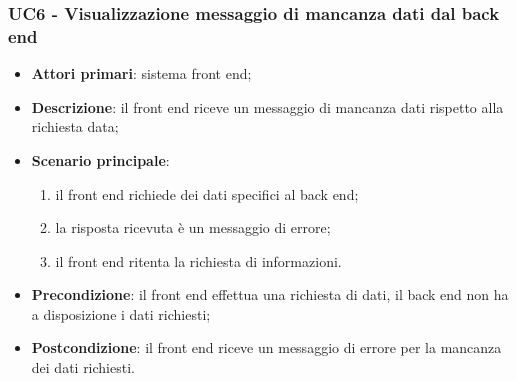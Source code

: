 \subsubsection{UC6 - Visualizzazione messaggio di mancanza dati dal back end}\label{VisualizzazioneMancanzaBackEnd}
\begin{itemize}
	\item \textbf{Attori primari}: sistema front end;
	\item \textbf{Descrizione}: il front end riceve un messaggio di mancanza dati rispetto alla richiesta data;
	\item \textbf{Scenario principale}: 
	\begin{enumerate}
		\item il front end richiede dei dati specifici al back end;
		\item la risposta ricevuta è un messaggio di errore;
		\item il front end ritenta la richiesta di informazioni. 
	\end{enumerate}
	\item \textbf{Precondizione}: il front end effettua una richiesta di dati, il back end non ha a disposizione i dati richiesti;
	\item \textbf{Postcondizione}: il front end riceve un messaggio di errore per la mancanza dei dati richiesti. 
\end{itemize}

